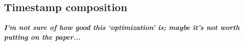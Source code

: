 \documentclass[times, 10pt]{article}
\begin{document}
% 
% 
% 
% 
% 

\subsection{Timestamp composition}
\label{sec:compositets}

\textit{\textbf{I'm not sure of how good this `optimization' is; maybe it's not worth putting on the paper...}}
\end{document}

